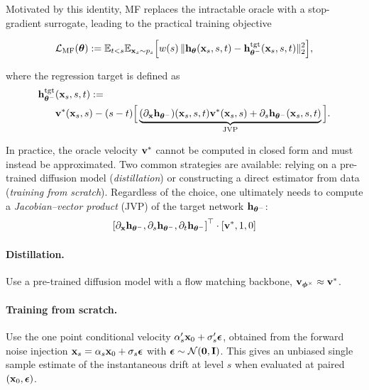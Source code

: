 Motivated by this identity, MF replaces the intractable oracle with a stop-gradient surrogate, leading to the practical training objective
\begin{mdframed}
\begin{align}\label{eq:mf-practice}
    \mathcal{L}_{\mathrm{MF}}({\bm{\theta}})
:= \mathbb{E}_{t<s} \mathbb{E}_{{\mathbf{x}}_s\sim p_s}\Big[w(s)\,
\|{\mathbf{h}}_{{\bm{\theta}}}({\mathbf{x}}_s,s,t) - {\mathbf{h}}_{{\bm{\theta}}^-}^{\mathrm{tgt}}({\mathbf{x}}_s,s,t)\|_2^2\Big],
\end{align}
\end{mdframed}
where the regression target is defined as
\begin{align*}
    {\mathbf{h}}_{{\bm{\theta}}^-}^{\mathrm{tgt}}&({\mathbf{x}}_s,s,t)
:= \\ &{\mathbf{v}}^*({\mathbf{x}}_s,s) - (s-t)\Big[\underbrace{(\partial_{{\mathbf{x}}}{\mathbf{h}}_{{\bm{\theta}}^-})({\mathbf{x}}_s,s,t) {\mathbf{v}}^*({\mathbf{x}}_s,s)
+ \partial_s {\mathbf{h}}_{{\bm{\theta}}^-}({\mathbf{x}}_s,s,t)}_{\mathrm{JVP}}\Big].
\end{align*}

In practice, the oracle velocity ${\mathbf{v}}^*$ cannot be computed in closed form and
must instead be approximated. Two common strategies are available: relying on a
pre-trained diffusion model (\emph{distillation}) or constructing a direct
estimator from data (\emph{training from scratch}). Regardless of the choice, one ultimately needs to compute a
\emph{Jacobian--vector product}  (JVP) of the target network
${\mathbf{h}}_{{\bm{\theta}}^-}$:
\[ 
\left[\partial_{\mathbf{x}} {\mathbf{h}}_{{\bm{\theta}}^-}, \partial_s {\mathbf{h}}_{{\bm{\theta}}^-}, \partial_t {\mathbf{h}}_{{\bm{\theta}}^-}\right]^\top \cdot \left[{\mathbf{v}}^*, 1, 0\right]
\]


\paragraph{Distillation.}
Use a pre-trained diffusion model with a flow matching backbone,
${\mathbf{v}}_{{\bm{\phi}}^\times} \approx {\mathbf{v}}^*$.

\paragraph{Training from scratch.}
Use the one point conditional velocity $\alpha_s'{\mathbf{x}}_0 + \sigma_s'{\bm{\epsilon}}$,
obtained from the forward noise injection ${\mathbf{x}}_s=\alpha_s{\mathbf{x}}_0+\sigma_s{\bm{\epsilon}}$ with
${\bm{\epsilon}}\sim\mathcal N(\bm{0},{\mathbf{I}})$. This gives an unbiased single sample estimate of the
instantaneous drift at level $s$ when evaluated at paired $({\mathbf{x}}_0,{\bm{\epsilon}})$.


